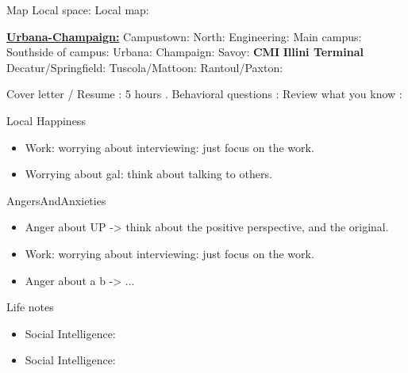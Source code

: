 \documentclass[serif, mathserif, final]{beamer}
\begin{document}
\begin{frame}
\begin{columns}
\begin{column}{0.25\linewidth}
\begin{block}{Map}
      Local space: 
      Local map: 

      \textbf{\underline{Urbana-Champaign:}} 
        Campustown: 
        North: Engineering: 
        Main campus: 
        Southside of campus:         
        Urbana: 
        Champaign: 
        Savoy: 
        \textbf{CMI} 
        \textbf{Illini Terminal} 
        Decatur/Springfield: 
        Tuscola/Mattoon: 
        Rantoul/Paxton: 
        
        Cover letter / Resume : 5 hours .
        Behavioral questions : 
        Review what you know : 
    \end{block}
    
      \begin{block}{Local Happiness}
        \begin{itemize} 
          \tiny \item \tiny Work: worrying about interviewing: just focus on the work. 
        \item \tiny Worrying about gal: think about talking to others. 
        \end{itemize}
      \end{block} 

      \begin{block}{AngersAndAnxieties}
        \begin{itemize}
          \item \tiny Anger about UP -> think about the positive
            perspective, and the original.
          \tiny \item \tiny Work: worrying about interviewing: just
          focus on the work. 
          \item \tiny Anger about a b  -> ...
        \end{itemize}
      \end{block}
      \begin{block}{Life notes}
        \begin{itemize}
        \tiny \item \tiny Social Intelligence: 
        \item \tiny Social Intelligence: 
        \end{itemize}
      \end{block}
\end{column}


\end{columns}
\end{frame}
\end{document}
